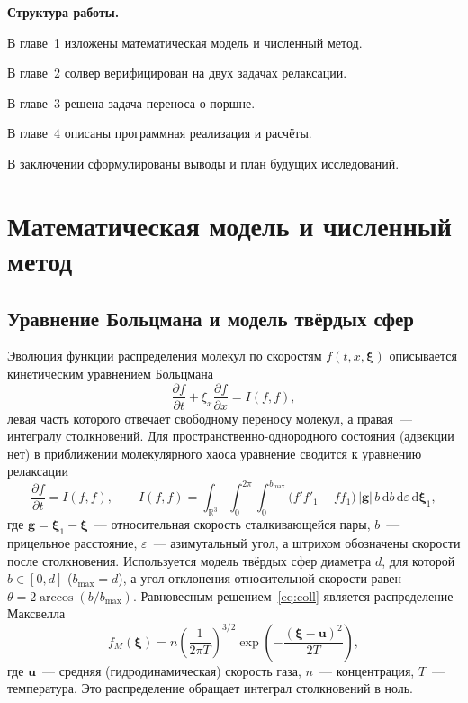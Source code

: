 \documentclass[14pt,a4paper]{extreport}
\numberwithin{equation}{chapter}
\numberwithin{figure}{chapter}
\numberwithin{table}{chapter}
\newcommand{\xv}{\boldsymbol{\xi}}
\newcommand{\gv}{\mathbf{g}}
\newcommand{\dd}{\,\mathrm{d}}
\begin{document}
\textbf{Структура работы.}

В главе~1 изложены математическая модель и численный метод.

В главе~2 солвер верифицирован на двух задачах релаксации.

В главе~3 решена задача переноса о поршне.

В главе~4 описаны программная реализация и расчёты.

В заключении сформулированы выводы и план будущих исследований.



\chapter{Математическая модель и численный метод}

\section{Уравнение Больцмана и модель твёрдых сфер}

Эволюция функции распределения молекул по скоростям $f(t,x,\xv)$ описывается кинетическим уравнением Больцмана
\begin{equation}
  \frac{\partial f}{\partial t} + \xi_x\frac{\partial f}{\partial x} = I(f,f),
  \label{eq:cbe}
\end{equation}
левая часть которого отвечает свободному переносу молекул, а правая~--- интегралу столкновений.
Для пространственно-однородного состояния (адвекции нет) в приближении молекулярного хаоса уравнение сводится к
уравнению релаксации
\begin{equation}
  \frac{\partial f}{\partial t} = I(f,f),\qquad
  I(f,f)=\int_{\mathbb{R}^3}\!\int_0^{2\pi}\!\int_0^{b_{\max}}\big(f'f'_1-f f_1\big)\,|\gv|\,b\dd b\dd\varepsilon\dd\xv_1,
  \label{eq:coll}
\end{equation}
где $\gv=\xv_1-\xv$~--- относительная скорость сталкивающейся пары, $b$~--- прицельное расстояние, $\varepsilon$~---
азимутальный угол, а штрихом обозначены скорости после столкновения.
Используется модель твёрдых сфер диаметра $d$, для которой $b\in[0,d]$ ($b_{\max}=d$), а угол отклонения относительной
скорости равен $\theta=2\arccos(b/b_{\max})$.
Равновесным решением~\eqref{eq:coll} является распределение Максвелла
\begin{equation}
  f_M(\xv)=n\left(\frac{1}{2\pi T}\right)^{3/2}\exp\!\left(-\frac{(\xv-\mathbf u)^2}{2T}\right),
  \label{eq:Maxwell}
\end{equation}
где $\mathbf u$~--- средняя (гидродинамическая) скорость газа, $n$~--- концентрация, $T$~--- температура.
Это распределение обращает интеграл столкновений в ноль.
\end{document}

